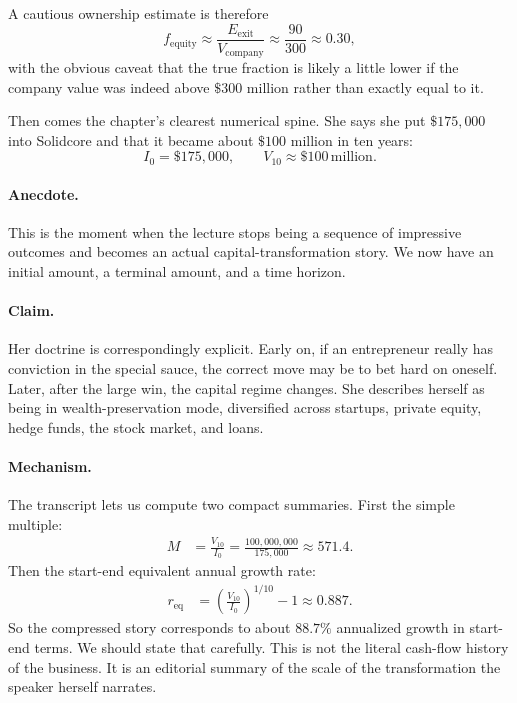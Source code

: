A cautious ownership estimate is therefore
\begin{equation}
f_{\text{equity}}
\approx
\frac{E_{\text{exit}}}{V_{\text{company}}}
\approx
\frac{90}{300}
\approx
0.30,
\end{equation}
with the obvious caveat that the true fraction is likely a little lower if the company value was indeed above \(\$300\) million rather than exactly equal to it.

Then comes the chapter's clearest numerical spine. She says she put \(\$175{,}000\) into Solidcore and that it became about \(\$100\) million in ten years:
\begin{equation}
I_0=\$175{,}000,
\qquad
V_{10}\approx \$100\,\text{million}.
\end{equation}

\paragraph{Anecdote.}
This is the moment when the lecture stops being a sequence of impressive outcomes and becomes an actual capital-transformation story. We now have an initial amount, a terminal amount, and a time horizon.

\paragraph{Claim.}
Her doctrine is correspondingly explicit. Early on, if an entrepreneur really has conviction in the special sauce, the correct move may be to bet hard on oneself. Later, after the large win, the capital regime changes. She describes herself as being in wealth-preservation mode, diversified across startups, private equity, hedge funds, the stock market, and loans.

\paragraph{Mechanism.}
The transcript lets us compute two compact summaries. First the simple multiple:
\begin{align}
M
&=
\frac{V_{10}}{I_0}
=
\frac{100{,}000{,}000}{175{,}000}
\approx 571.4.
\end{align}
Then the start-end equivalent annual growth rate:
\begin{align}
r_{\text{eq}}
&=
\left(\frac{V_{10}}{I_0}\right)^{1/10}-1
\approx 0.887.
\end{align}
So the compressed story corresponds to about \(88.7\%\) annualized growth in start-end terms. We should state that carefully. This is not the literal cash-flow history of the business. It is an editorial summary of the scale of the transformation the speaker herself narrates.

